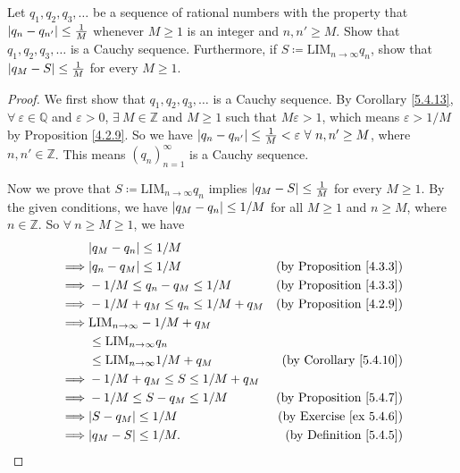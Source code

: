 \begin{exercise}\label{ex 5.5.4}
Let \(q_1, q_2, q_3, \dots\) be a sequence of rational numbers with the property that \(\abs*{q_n - q_{n'}} \leq \frac{1}{M}\) whenever \(M \geq 1\) is an integer and \(n, n' \geq M\).
Show that \(q_1, q_2, q_3, \dots\) is a Cauchy sequence.
Furthermore, if \(S \coloneqq \text{LIM}_{n \to \infty} q_n\), show that \(\abs*{q_M - S} \leq \frac{1}{M}\) for every \(M \geq 1\).
\end{exercise}

\begin{proof}
We first show that \(q_1, q_2, q_3, \dots\) is a Cauchy sequence.
By Corollary \ref{5.4.13}, \(\forall\ \varepsilon \in \mathds{Q}\) and \(\varepsilon > 0\), \(\exists\ M \in \mathds{Z}\) and \(M \geq 1\) such that \(M\varepsilon > 1\), which means \(\varepsilon > 1 / M\) by Proposition \ref{4.2.9}.
So we have \(\abs*{q_n - q_{n'}} \leq \frac{1}{M} < \varepsilon \ \forall\ n, n' \geq M\), where \(n, n' \in \mathds{Z}\).
This means \((q_n)_{n = 1}^{\infty}\) is a Cauchy sequence.

Now we prove that \(S \coloneqq \text{LIM}_{n \to \infty} q_n\) implies \(\abs*{q_M - S} \leq \frac{1}{M}\) for every \(M \geq 1\).
By the given conditions, we have \(\abs*{q_M - q_n} \leq 1 / M\) for all \(M \geq 1\) and \(n \geq M\), where \(n \in \mathds{Z}\).
So \(\forall\ n \geq M \geq 1\), we have
\begin{align*}
& \abs*{q_M - q_n} \leq 1 / M \\
\implies & \abs*{q_n - q_M} \leq 1 / M & \text{(by Proposition \ref{4.3.3})} \\
\implies & -1 / M \leq q_n - q_M \leq 1 / M & \text{(by Proposition \ref{4.3.3})} \\
\implies & -1 / M + q_M \leq q_n \leq 1 / M + q_M & \text{(by Proposition \ref{4.2.9})} \\
\implies & \text{LIM}_{n \to \infty} -1 / M + q_M \\
& \leq \text{LIM}_{n \to \infty} q_n \\
& \leq \text{LIM}_{n \to \infty} 1 / M + q_M & \text{(by Corollary \ref{5.4.10})} \\
\implies & -1 / M + q_M \leq S \leq 1 / M + q_M \\
\implies & -1 / M \leq S - q_M \leq 1 / M & \text{(by Proposition \ref{5.4.7})} \\
\implies & \abs*{S - q_M} \leq 1 / M & \text{(by Exercise \ref{ex 5.4.6})} \\
\implies & \abs*{q_M - S} \leq 1 / M. & \text{(by Definition \ref{5.4.5})}
\end{align*}
\end{proof}

